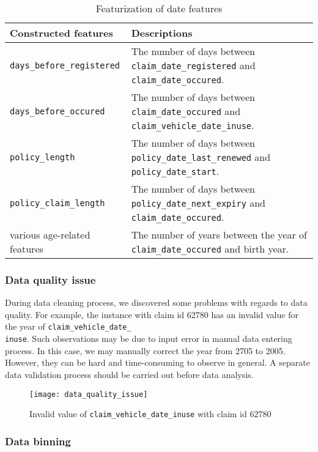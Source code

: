 \documentclass[12pt]{article}
\begin{document}
\begin{table}[h]
	\begin{tabular}{|l|p{11.5cm}|}
	\hline
	Constructed features & Descriptions\\
	\hline
	\texttt{days\_before\_registered} & The number of days between \texttt{claim\_date\_registered} and \texttt{claim\_date\_occured}.\\
	\hline
	\texttt{days\_before\_occured} & The number of days between \texttt{claim\_date\_occured} and \texttt{claim\_vehicle\_date\_inuse}.\\
	\hline
	\texttt{policy\_length} & The number of days between \texttt{policy\_date\_last\_renewed} and \texttt{policy\_date\_start}.\\
	\hline
	\texttt{policy\_claim\_length} & The number of days between \texttt{policy\_date\_next\_expiry} and \texttt{claim\_date\_occured}.\\
	\hline
	various age-related features & The number of years between the year of \texttt{claim\_date\_occured} and birth year.\\	
	\hline
	\end{tabular}
	\caption{Featurization of date features}
\end{table}

\vspace{-1cm}
\subsubsection*{Data quality issue}

During data cleaning process, we discovered some problems with regards to data quality. For example, the instance with claim id 62780 has an invalid value for the year of \texttt{claim\_vehicle\_date\_\\inuse}. Such observations may be due to input error in manual data entering process. In this case, we may manually correct the year from 2705 to 2005. However, they can be hard and time-consuming to observe in general. A separate data validation process should be carried out before data analysis.

\begin{figure}[h]
\centering
\texttt{[image: data\_quality\_issue]}
\caption{Invalid value of \texttt{claim\_vehicle\_date\_inuse} with claim id 62780}
\end{figure}


\vspace{-1cm}
\subsubsection*{Data binning}
\end{document}
